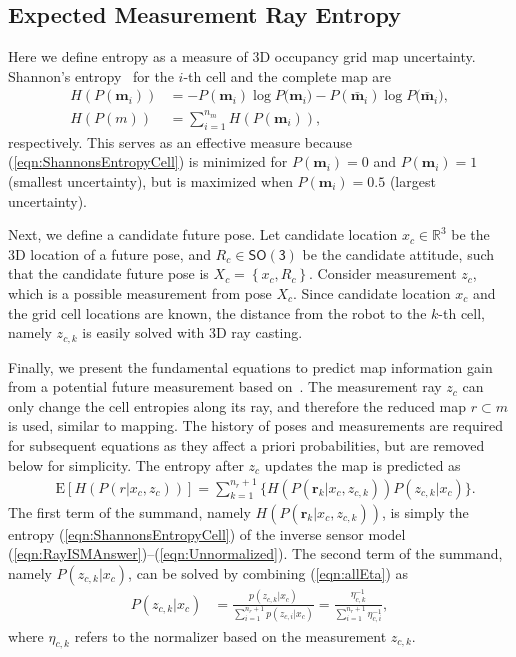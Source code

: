 \documentclass[conf]{new-aiaa}
\newcommand{\braces}[1]{\ensuremath{\left\{ #1 \right\}}}
\newcommand{\refeqn}[1]{(\ref{eqn:#1})}
\newcommand{\SO}{\ensuremath{\mathsf{SO(3)}}}
\renewcommand{\Re}{\ensuremath{\mathbb{R}}}
\begin{document}
\subsection{Expected Measurement Ray Entropy}

Here we define entropy as a measure of 3D occupancy grid map uncertainty. Shannon's entropy~\cite{StaGriBur05} for the $i$-th cell and the complete map are
\begin{align}
\label{eqn:ShannonsEntropyCell}
H(P(\mathbf{m}_i))&=-P(\mathbf{m}_i)\log{P(\mathbf{m}_i})-P(\bar{\mathbf{m}}_i)\log{P(\bar{\mathbf{m}}_i}),
\\
\label{eqn:ShannonsEntropyMap}
H(P(m))&=\sum_{i=1}^{n_m}H(P(\mathbf{m}_i)),
\end{align}
respectively. This serves as an effective measure because \refeqn{ShannonsEntropyCell} is minimized for $P(\mathbf{m}_i)=0$ and $P(\mathbf{m}_i)=1$ (smallest uncertainty), but is maximized when $P(\mathbf{m}_i)=0.5$ (largest uncertainty).

Next, we define a candidate future pose. Let candidate location $x_c\in\Re^3$ be the 3D location of a future pose, and $R_c\in\SO$ be the candidate attitude, such that the candidate future pose is $X_c=\braces{x_c,R_c}$. Consider measurement $z_c$, which is a possible measurement from pose $X_c$. Since candidate location $x_c$ and the grid cell locations are known, the distance from the robot to the $k$-th cell, namely $z_{c,k}$ is easily solved with 3D ray casting.

Finally, we present the fundamental equations to predict map information gain from a potential future measurement based on~\cite{KauAiLee16}. The measurement ray $z_c$ can only change the cell entropies along its ray, and therefore the reduced map $r\subset m$ is used, similar to mapping. The history of poses and measurements are required for subsequent equations as they affect a priori probabilities, but are removed below for simplicity. The entropy after $z_c$ updates the map is predicted as
\begin{align}
\label{eqn:DiscExpEntropyRay}
&\text{E}[H(P(r|x_c,z_{c}))]=\sum_{k=1}^{n_{r}+1}\bigg\{H(P(\mathbf{r}_k|x_c,z_{c,k}))P(z_{c,k}|x_c)\bigg\}.
\end{align}
The first term of the summand, namely $H(P(\mathbf{r}_k|x_c,z_{c,k}))$, is simply the entropy \refeqn{ShannonsEntropyCell} of the inverse sensor model \refeqn{RayISMAnswer}--\refeqn{Unnormalized}. The second term of the summand, namely $P(z_{c,k}|x_c)$, can be solved by combining \refeqn{allEta} as
\begin{align}
\label{eqn:ProbMeas}
P(z_{c,k}|x_c)&=\frac{p(z_{c,k}|x_c)}{\sum_{i=1}^{n_{r}+1}p(z_{c,i}|x_c)}=\frac{\eta_{c,k}^{-1}}{\sum_{i=1}^{n_{r}+1}\eta_{c,i}^{-1}},
\end{align}
where $\eta_{c,k}$ refers to the normalizer based on the measurement $z_{c,k}$.
\end{document}
